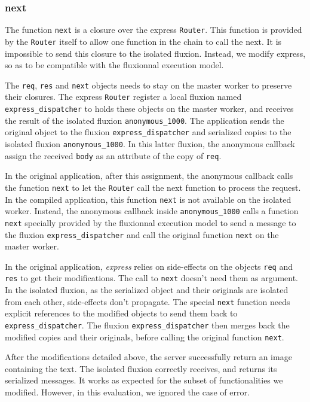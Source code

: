 \subsubsection{next}

The function \texttt{next} is a closure over the express \texttt{Router}.
This function is provided by the \texttt{Router} itself to allow one function in the chain to call the next.
It is impossible to send this closure to the isolated fluxion.
Instead, we modify express, so as to be compatible with the fluxionnal execution model.

The \texttt{req}, \texttt{res} and \texttt{next} objects needs to stay on the master worker to preserve their closures.
The express \texttt{Router} register a local fluxion named \texttt{express\_dispatcher} to holds these objects on the master worker, and receives the result of the isolated fluxion \texttt{anonymous\_1000}.
The application sends the original object to the fluxion \texttt{express\_dispatcher} and serialized copies to the isolated fluxion \texttt{anonymous\_1000}.
In this latter fluxion, the anonymous callback assign the received \texttt{body} as an attribute of the copy of \texttt{req}.

In the original application, after this assignment, the anonymous callback calls the function \texttt{next} to let the \texttt{Router} call the next function to process the request.
In the compiled application, this function \texttt{next} is not available on the isolated worker.
Instead, the anonymous callback inside \texttt{anonymous\-\_1000} calls a function \texttt{next} specially provided by the fluxionnal execution model to send a message to the fluxion \texttt{express\-\_dispatcher} and call the original function \texttt{next} on the master worker.

In the original application, \textit{express} relies on side-effects on the objects \texttt{req} and \texttt{res} to get their modifications.
The call to \texttt{next} doesn't need them as argument.
In the isolated fluxion, as the serialized object and their originals are isolated from each other, side-effects don't propagate.
The special \texttt{next} function needs explicit references to the modified objects to send them back to \texttt{express\_dispatcher}.
The fluxion \texttt{express\_dispatcher} then merges back the modified copies and their originals, before calling the original function \texttt{next}.

After the modifications detailed above, the server successfully return an image containing the text.
The isolated fluxion correctly receives, and returns its serialized messages.
It works as expected for the subset of functionalities we modified.
However, in this evaluation, we ignored the case of error.

